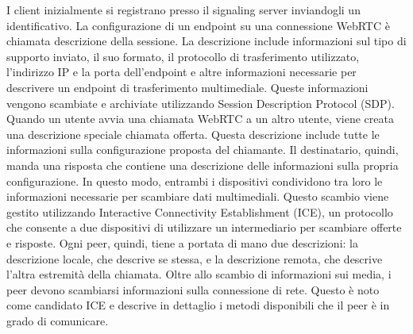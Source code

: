 I client inizialmente si registrano presso il signaling server inviandogli un identificativo. 
La configurazione di un endpoint su una connessione WebRTC è chiamata descrizione della sessione. La descrizione include informazioni sul tipo di supporto inviato, il suo formato, il protocollo di trasferimento utilizzato, l'indirizzo IP e la porta dell'endpoint e altre informazioni necessarie per descrivere un endpoint di trasferimento multimediale. Queste informazioni vengono scambiate e archiviate utilizzando Session Description Protocol (SDP). Quando un utente avvia una chiamata WebRTC a un altro utente, viene creata una descrizione speciale chiamata offerta. Questa descrizione include tutte le informazioni sulla configurazione proposta del chiamante. Il destinatario, quindi, manda una risposta che contiene una descrizione delle informazioni sulla propria configurazione. In questo modo, entrambi i dispositivi condividono tra loro le informazioni necessarie per scambiare dati multimediali. Questo scambio viene gestito utilizzando Interactive Connectivity Establishment (ICE), un protocollo che consente a due dispositivi di utilizzare un intermediario per scambiare offerte e risposte. Ogni peer, quindi, tiene a portata di mano due descrizioni: la descrizione locale, che descrive se stessa, e la descrizione remota, che descrive l'altra estremità della chiamata.
Oltre allo scambio di informazioni sui media, i peer devono scambiarsi informazioni sulla connessione di rete. Questo è noto come candidato ICE e descrive in dettaglio i metodi disponibili che il peer è in grado di comunicare.